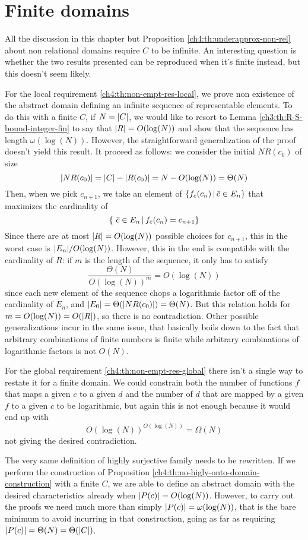 \section{Finite domains}
All the discussion in this chapter but Proposition \ref{ch4:th:underapprox-non-rel} about non relational domains require $C$ to be infinite. An interesting question is whether the two results presented can be reproduced when it's finite instead, but this doesn't seem likely.

For the local requirement \ref{ch4:th:non-empt-res-local}, we prove non existence of the abstract domain defining an infinite sequence of representable elements. To do this with a finite $C$, if $N = \lvert C\rvert$, we would like to resort to Lemma \ref{ch3:th:R-S-bound-integer-fin} to say that $\lvert R\rvert = O(\log(N))$ and show that the sequence has length $\omega(\log(N))$. However, the straightforward generalization of the proof doesn't yield this result. It proceed as follows: we consider the initial $NR(c_0)$ of size
\[
\lvert NR(c_0)\rvert = \lvert C\rvert - \lvert R(c_0)\rvert = N - O(\log(N)) = \Theta(N)
\]
Then, when we pick $c_{n+1}$, we take an element of $\{ f_{\bar{c}}(c_n) \,\vert\, \bar{c} \in E_n \}$ that maximizes the cardinality of
\[
\{\ \bar{c} \in E_n \,\vert\, f_{\bar{c}}(c_n) = c_{n+1} \}
\]
Since there are at most $\lvert R\rvert = O(\log(N))$ possible choices for $c_{n+1}$, this in the worst case is $\lvert E_n\rvert / O(\log(N))$. However, this in the end is compatible with the cardinality of $R$: if $m$ is the length of the sequence, it only has to satisfy
\[
\frac{\Theta(N)}{O(\log(N))^m} = O(\log(N))
\]
since each new element of the sequence chops a logarithmic factor off of the cardinality of $E_n$, and $\lvert E_0\rvert = \Theta(\lvert NR(c_0)\rvert) = \Theta(N)$. But this relation holds for $m = O(\log(N)) = O(\lvert R\rvert)$, so there is no contradiction.
Other possible generalizations incur in the same issue, that basically boils down to the fact that arbitrary combinations of finite numbers is finite while arbitrary combinations of logarithmic factors is not $O(N)$.

For the global requirement \ref{ch4:th:non-empt-res-global} there isn't a single way to restate it for a finite domain. We could constrain both the number of functions $f$ that maps a given $c$ to a given $d$ and the number of $d$ that are mapped by a given $f$ to a given $c$ to be logarithmic, but again this is not enough because it would end up with
\[
O(\log(N))^{O(\log(N))} = \Omega(N)
\]
not giving the desired contradiction.

The very same definition of highly surjective family needs to be rewritten. If we perform the construction of Proposition \ref{ch4:th:no-higly-onto-domain-construction} with a finite $C$, we are able to define an abstract domain with the desired characteristics already when $\lvert P(c)\rvert = O(\log(N))$. However, to carry out the proofs we need much more than simply $\lvert P(c)\rvert = \omega(\log(N))$, that is the bare minimum to avoid incurring in that construction, going as far as requiring $\lvert P(c)\rvert = \Theta(N) = \Theta(\lvert C\rvert)$.

